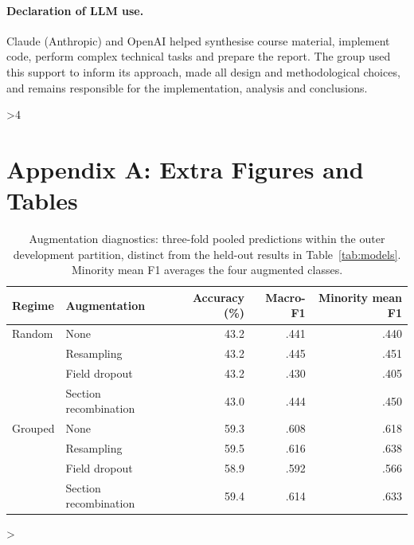 \documentclass[twocolumn,10pt]{article}
\begin{document}
\paragraph{Declaration of LLM use.}
Claude (Anthropic) and OpenAI helped synthesise course material, implement code, perform complex technical tasks and prepare the report. The group used this support to inform its approach, made all design and methodological choices, and remains responsible for the implementation, analysis and conclusions.

\clearpage
\ifnum\value{page}>4 \fi



\clearpage
\onecolumn
{}
\setcounter{appendixstart}{\value{page}}
\appendix
\section*{Appendix A: Extra Figures and Tables}

\begin{table}[H]
\centering\small
\begin{tabular}{llrrr}
\toprule
Regime & Augmentation & Accuracy (\%) & Macro-F1 & Minority mean F1\\\midrule
Random & None &43.2&.441&.440\\
& Resampling &43.2&.445&.451\\
& Field dropout &43.2&.430&.405\\
& Section recombination &43.0&.444&.450\\
Grouped & None &59.3&.608&.618\\
& Resampling &59.5&.616&.638\\
& Field dropout &58.9&.592&.566\\
& Section recombination &59.4&.614&.633\\\bottomrule
\end{tabular}
\caption{Augmentation diagnostics: three-fold pooled predictions within the outer development partition, distinct from the held-out results in Table~\ref{tab:models}. Minority mean F1 averages the four augmented classes.}\label{tab:aug}
\end{table}
\clearpage
\addtocounter{appendixstart}{1}
\ifnum\value{page}>\value{appendixstart} \fi
\end{document}
